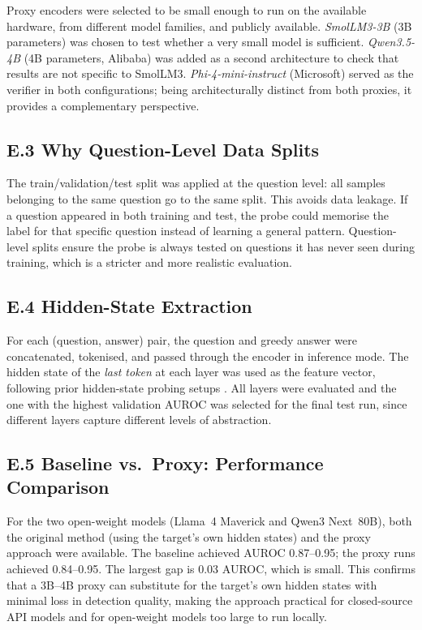 \documentclass[12pt,twocolumn]{article}
\begin{document}
Proxy encoders were selected to be small enough to run on the
available hardware, from different model families, and publicly
available. \textit{SmolLM3-3B} (3B parameters) was chosen to test
whether a very small model is sufficient. \textit{Qwen3.5-4B}
(4B parameters, Alibaba) was added as a second architecture to check
that results are not specific to SmolLM3. \textit{Phi-4-mini-instruct}
(Microsoft) served as the verifier in both configurations; being
architecturally distinct from both proxies, it provides a
complementary perspective.

\subsection*{E.3 Why Question-Level Data Splits}

The train/validation/test split was applied at the question level:
all samples belonging to the same question go to the same split.
This avoids data leakage. If a question appeared in both training
and test, the probe could memorise the label for that specific
question instead of learning a general pattern. Question-level
splits ensure the probe is always tested on questions it has never
seen during training, which is a stricter and more realistic
evaluation.

\subsection*{E.4 Hidden-State Extraction}

For each (question, answer) pair, the question and greedy answer
were concatenated, tokenised, and passed through the encoder in
inference mode. The hidden state of the \emph{last token} at each
layer was used as the feature vector, following prior hidden-state
probing setups \citep{tan2025consistent, han2025factuality}. All layers were
evaluated and the one with the highest validation AUROC was selected
for the final test run, since different layers capture different
levels of abstraction.

\subsection*{E.5 Baseline vs.\ Proxy: Performance Comparison}

For the two open-weight models (Llama~4 Maverick and Qwen3
Next~80B), both the original method (using the target's own hidden
states) and the proxy approach were available. The baseline achieved
AUROC 0.87--0.95; the proxy runs achieved 0.84--0.95. The largest
gap is 0.03 AUROC, which is small. This confirms that a 3B--4B
proxy can substitute for the target's own hidden states with
minimal loss in detection quality, making the approach practical for
closed-source API models and for open-weight models too large to run
locally.

\printbibliography
\end{document}
